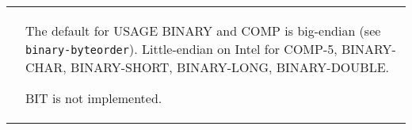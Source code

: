 \documentclass[10pt,landscape]{article}
\begin{document}
\begin{tabular}{p{15cm}p{10cm}}
&

The default for USAGE BINARY and COMP is big-endian (see {\tt
  binary-byteorder}). Little-endian on Intel for COMP-5, BINARY-CHAR,
BINARY-SHORT, BINARY-LONG, BINARY-DOUBLE.

BIT is not implemented.
\end{tabular}
\end{document}
